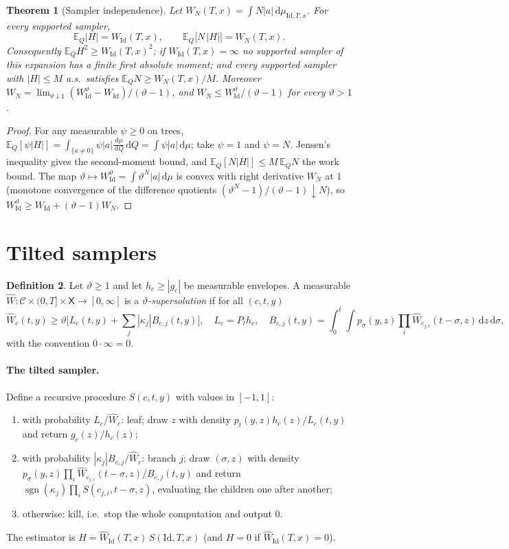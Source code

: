 \documentclass[11pt]{article}
\newtheorem{theorem}{Theorem}[section]
\theoremstyle{definition}
\newtheorem{definition}[theorem]{Definition}
\theoremstyle{remark}
\newcommand{\E}{\mathbb{E}}
\newcommand{\X}{\mathsf{X}}
\newcommand{\C}{\mathcal{C}}
\newcommand{\Id}{\mathrm{Id}}
\newcommand{\dd}{\,\mathrm{d}}
\newcommand{\sgn}{\operatorname{sgn}}
\newcommand{\Wh}{\widehat W}
\begin{document}
\begin{theorem}[Sampler independence]\label{thm:A}
Let $W_N(T,x)=\int N|a|\dd\mu_{\Id,T,x}$. For every supported sampler,
\[
\E_Q|H|=W_\Id(T,x),\qquad \E_Q\big[N\,|H|\big]=W_N(T,x).
\]
Consequently $\E_QH^2\ge W_\Id(T,x)^2$; if $W_\Id(T,x)=\infty$ no
supported sampler of this expansion has a finite first absolute moment;
and every supported sampler with $|H|\le M$ a.s.\ satisfies
$\E_QN\ge W_N(T,x)/M$. Moreover $W_N=\lim_{\vartheta\downarrow1}
(W^\vartheta_\Id-W_\Id)/(\vartheta-1)$, and
$W_N\le W^\vartheta_\Id/(\vartheta-1)$ for every $\vartheta>1$.
\end{theorem}
\begin{proof}
For any measurable $\psi\ge0$ on trees,
$\E_Q[\psi|H|]=\int_{\{a\ne0\}}\psi|a|\frac{\dd\mu}{\dd Q}\dd Q
=\int\psi|a|\dd\mu$; take $\psi=1$ and $\psi=N$. Jensen's inequality gives
the second-moment bound, and $\E_Q[N|H|]\le M\,\E_QN$ the work bound. The
map $\vartheta\mapsto W^\vartheta_\Id=\int\vartheta^N|a|\dd\mu$ is convex
with right derivative $W_N$ at $1$ (monotone convergence of the difference
quotients $(\vartheta^N-1)/(\vartheta-1)\downarrow N$), so
$W^\vartheta_\Id\ge W_\Id+(\vartheta-1)W_N$.
\end{proof}

\section{Tilted samplers}\label{sec:B}

\begin{definition}\label{def:super}
Let $\vartheta\ge1$ and let $h_c\ge|g_c|$ be measurable envelopes. A
measurable $\Wh:\C\times(0,T]\times\X\to[0,\infty]$ is a
\emph{$\vartheta$-supersolution} if for all $(c,t,y)$
\begin{equation}\label{eq:super}
\Wh_c(t,y)\ge\vartheta\Big[L_c(t,y)+\sum_j|\kappa_j|B_{c,j}(t,y)\Big],
\quad L_c=P_th_c,\quad
B_{c,j}(t,y)=\int_0^t\!\!\int p_\sigma(y,z)\prod_i\Wh_{c_{j,i}}(t-\sigma,z)\dd z\dd\sigma,
\end{equation}
with the convention $0\cdot\infty=0$.
\end{definition}

\paragraph{The tilted sampler.} Define a recursive procedure
$S(c,t,y)$ with values in $[-1,1]$:
\begin{enumerate}[leftmargin=*]
\item with probability $L_c/\Wh_c$: leaf; draw $z$ with density
$p_t(y,z)h_c(z)/L_c(t,y)$ and return $g_c(z)/h_c(z)$;
\item with probability $|\kappa_j|B_{c,j}/\Wh_c$: branch $j$; draw
$(\sigma,z)$ with density
$p_\sigma(y,z)\prod_i\Wh_{c_{j,i}}(t-\sigma,z)/B_{c,j}(t,y)$ and return
$\sgn(\kappa_j)\prod_iS(c_{j,i},t-\sigma,z)$, evaluating the children
one after another;
\item otherwise: kill, i.e.\ stop the whole computation and output $0$.
\end{enumerate}
The estimator is $H=\Wh_\Id(T,x)\,S(\Id,T,x)$ (and $H=0$ if
$\Wh_\Id(T,x)=0$).
\end{document}
